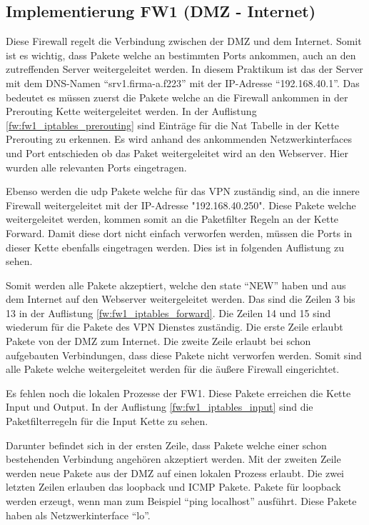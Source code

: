 \subsection{Implementierung FW1 (DMZ - Internet)}
Diese Firewall regelt die Verbindung zwischen der DMZ und dem Internet. Somit ist es wichtig, dass Pakete welche an bestimmten Ports ankommen, auch an den zutreffenden Server weitergeleitet werden. In diesem Praktikum ist das der Server mit dem DNS-Namen "`srv1.firma-a.f223"' mit der IP-Adresse "`192.168.40.1"'. Das bedeutet es müssen zuerst die Pakete welche an die Firewall ankommen in der Prerouting Kette weitergeleitet werden. In der Auflistung \ref{fw:fw1_iptables_prerouting} sind Einträge für die Nat Tabelle in der Kette Prerouting zu erkennen. Es wird anhand des ankommenden Netzwerkinterfaces und Port entschieden ob das Paket weitergeleitet wird an den Webserver. Hier wurden alle relevanten Ports eingetragen.

Ebenso werden die udp Pakete welche für das VPN zuständig sind, an die innere Firewall weitergeleitet mit der IP-Adresse "192.168.40.250". Diese Pakete welche weitergeleitet werden, kommen somit an die Paketfilter Regeln an der Kette Forward. Damit diese dort nicht einfach verworfen werden, müssen die Ports in dieser Kette ebenfalls eingetragen werden. Dies ist in folgenden Auflistung zu sehen.

Somit werden alle Pakete akzeptiert, welche den state "`NEW"' haben und aus dem Internet auf den Webserver weitergeleitet werden. Das sind die Zeilen 3 bis 13 in der Auflistung \ref{fw:fw1_iptables_forward}. Die Zeilen 14 und 15 sind wiederum für die Pakete des VPN Dienstes zuständig. Die erste Zeile erlaubt Pakete von der DMZ zum Internet. Die zweite Zeile erlaubt bei schon aufgebauten Verbindungen, dass diese Pakete nicht verworfen werden. Somit sind alle Pakete welche weitergeleitet werden für die äußere Firewall eingerichtet. 

Es fehlen noch die lokalen Prozesse der FW1. Diese Pakete erreichen die Kette Input und Output. In der Auflistung \ref{fw:fw1_iptables_input} sind die Paketfilterregeln für die Input Kette zu sehen.

Darunter befindet sich in der ersten Zeile, dass Pakete welche einer schon bestehenden Verbindung angehören akzeptiert werden. Mit der zweiten Zeile werden neue Pakete aus der DMZ auf einen lokalen Prozess erlaubt. Die zwei letzten Zeilen erlauben das loopback und ICMP Pakete. Pakete für loopback werden erzeugt, wenn man zum Beispiel "`ping localhost"' ausführt. Diese Pakete haben als Netzwerkinterface "`lo"'. 

